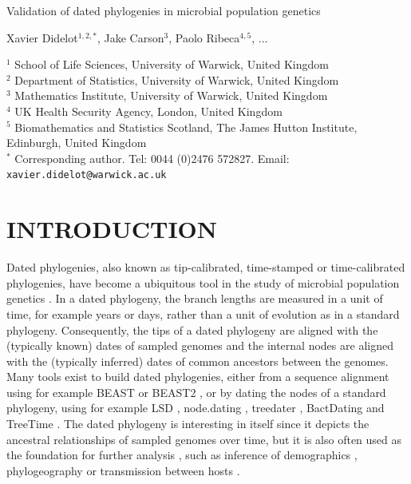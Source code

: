 \documentclass{article}
\begin{document}
{\Large Validation of dated phylogenies in microbial population genetics}


\vspace*{2cm}
Xavier Didelot$^{1,2,*}$, Jake Carson$^{3}$, Paolo Ribeca$^{4,5}$, ...

\vspace*{2cm}
$^1$ School of Life Sciences, University of Warwick, United Kingdom\\
$^2$ Department of Statistics, University of Warwick, United Kingdom\\
$^3$ Mathematics Institute, University of Warwick, United Kingdom\\
$^4$ UK Health Security Agency, London, United Kingdom\\
$^5$ Biomathematics and Statistics Scotland, The James Hutton Institute, Edinburgh, United Kingdom\\
$^*$ Corresponding author. Tel: 0044 (0)2476 572827. Email: \verb+xavier.didelot@warwick.ac.uk+


\newpage
\section*{INTRODUCTION}

Dated phylogenies, also known as tip-calibrated, time-stamped or time-calibrated phylogenies, have become a ubiquitous tool in the study of microbial population genetics 
\citep{Drummond2003,Biek2015,rieuxInferencesTipcalibratedPhylogenies2016}. In a dated phylogeny, the branch lengths are measured in a unit of time, for example years or days,
rather than a unit of evolution as in a standard phylogeny. Consequently, the tips of a dated phylogeny are aligned with the (typically known) dates of sampled genomes and
the internal nodes are aligned with the (typically inferred) dates of common ancestors between the genomes.
Many tools exist to build dated phylogenies, either from a sequence alignment using for example BEAST \citep{Suchard2018} or BEAST2 \citep{Bouckaert2019}, or by
dating the nodes of a standard phylogeny, using for example 
LSD \citep{To2016}, node.dating \citep{Jones2017}, treedater \citep{Volz2017}, BactDating \citep{Didelot2018} and TreeTime \citep{Sagulenko2018}.
The dated phylogeny is interesting in itself since it depicts the ancestral relationships of sampled genomes
over time, but it is also often used as the foundation for further analysis \citep{Didelot2022}, such as inference
of demographics \citep{Baele2016}, phylogeography \citep{Lemey2009} 
or transmission between hosts \citep{Didelot2017}.
\end{document}

